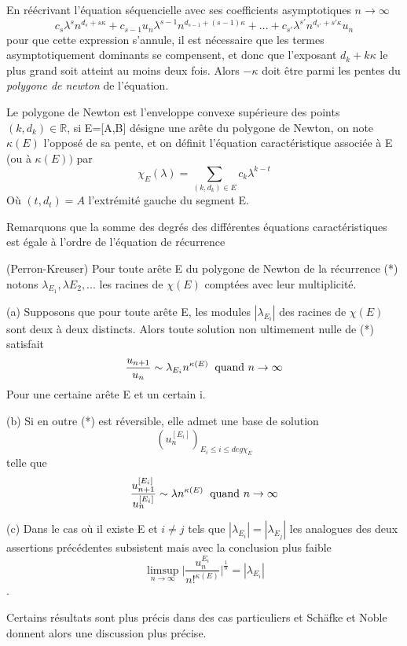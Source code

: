\documentclass[a4paper,10.5pt]{article}
\begin{document}
	\noindent En réécrivant l'équation séquencielle avec ses coefficients asymptotiques $n \rightarrow \infty$
	\[c_{s}\lambda^{s} n^{d_{s}+s\kappa}+c_{s-1}u_{n}\lambda^{s-1} n^{d_{s-1}+(s-1)\kappa}+...+c_{s'}\lambda^{s'} n^{d_{s'}+s'\kappa}u_{n}\]
	pour que cette expression s'annule, il est nécessaire que les termes asymptotiquement dominants se compensent, et donc que l'exposant $d_{k}+k\kappa$ le plus grand soit atteint au moins deux fois. Alors $-\kappa$ doit être parmi les pentes du \textit{polygone de newton} de l'équation.
	
	
	\begin{definition} Le polygone de Newton est l'enveloppe convexe supérieure des points $(k, d_{k}) \in \mathbb{R}$, si E=[A,B] désigne une arête du polygone de Newton, on note $\kappa(E)$ l'opposé de sa pente, et on définit l'équation caractéristique associée à E (ou à $\kappa(E))$ par
		\[\chi_{E}(\lambda)=\sum_{(k,d_{k}) \in E} c_{k}\lambda^{k-t}\]
		Où $(t,d_{t})=A$ l'extrémité gauche du segment E.
	\end{definition}
	
	Remarquons que la somme des degrés des différentes équations caractéristiques est égale à l'ordre de l'équation de récurrence 
	
	\begin{theorem} (Perron-Kreuser)
		Pour toute arête E du polygone de Newton de la récurrence (*) notons $\lambda_{E_{1}},\lambda{E_{2}},...$ les racines de $\chi(E)$ comptées avec leur multiplicité.
		
		(a) Supposons que pour toute arête E, les modules $|\lambda_{E_{i}}|$ des racines de $\chi(E)$ sont deux à deux distincts. Alors toute solution non ultimement nulle de (*) satisfait
		\[\frac{u_{n+1}}{u_{n}}\sim \lambda_{E_{i}}n^{\kappa(E)} \hspace{2mm} \text{quand } n \rightarrow \infty\]
		Pour une certaine arête E et un certain i.
		
		(b) Si en outre (*) est réversible, elle admet une base de solution 
		\[(u_{n}^{[E_{i}]})_{E_{i}\leq i \leq deg \chi_{E}}\]
		telle que 
		\[\frac{u_{n+1}^{[E_{i}]}}{u_{n}^{[E_{i}]}}\sim \lambda n^{\kappa(E)} \hspace{2mm} \text{quand } n \rightarrow \infty\]
		
		(c) Dans le cas où il existe E et $i \neq j$ tels que $|\lambda_{E_{i}}|=|\lambda_{E_{j}}|$ les analogues des deux assertions précédentes subsistent mais avec la conclusion plus faible
		\[\limsup_{n \rightarrow \infty } \big|\frac{u_{n}^{E_{i}}}{n!^{\kappa(E)}}\big|^{\frac{1}{n}}=|\lambda_{E_{i}}|\].
	\end{theorem}
	\vspace{7mm}
	Certains résultats sont plus précis dans des cas particuliers et Schäfke et Noble donnent alors une discussion plus précise.
	
\end{document}
